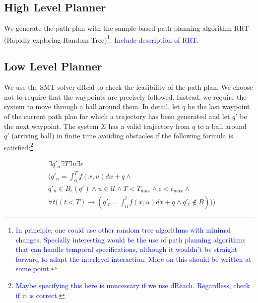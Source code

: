 \documentclass[12pt]{article}
\newcommand\fran[1]{\textcolor{blue}{#1}}
\newcommand\ffran[1]{\textcolor{blue}{\footnote{\fran{#1}}}}
\begin{document}
\subsection{High Level Planner}
\label{sub:high_level_planner}

We generate the path plan with the sample based path planning algorithm RRT (Rapidly exploring Random Tree)\ffran{In principle, one could use other random tree algorithms with minimal changes. Specially interesting would be the use of path planning algorithms that can handle temporal specifications, although it wouldn't be straight forward to adapt the interlevel interaction. More on this should be written at some point.}. \fran{Include description of RRT.}

\subsection{Low Level Planner}
\label{sub:low_level_planner}

We use the SMT solver dReal to check the feasibility of the path plan. We choose not to require that the waypoints are precisely followed. Instead, we require the system to move through a ball around them. In detail, let $q$ be the last waypoint of the current path plan for which a trajectory has been generated and let $q'$ be the next waypoint. The system $\Sigma$ has a valid trajectory from $q$ to a ball around $q'$ (arriving ball) in finite time avoiding obstacles if the following formula is satisfied:\ffran{Maybe specifying this here is unncessary if we use dReach. Regardless, check if it is correct.}

\begin{equation}
    \label{eq:reach_check}
    \begin{split}
        &\exists q'_n \exists T \exists u \exists \epsilon \\
        &\bigg(
            q'_n = \int_{0}^{T} f(x, u) dx + q \land \\
        &q'_n \in B_{\epsilon}(q') \land 
            u \in \mathcal{U} \land
            T < T_{max} \land
            \epsilon < \epsilon_{max} \land \\
        &\forall t \Big((t < T) \rightarrow 
            (q'_t = \int_{0}^{t} f(x, u) dx + q \land 
            q'_t \notin B )\Big)
        \bigg)
    \end{split}
\end{equation}
\end{document}
